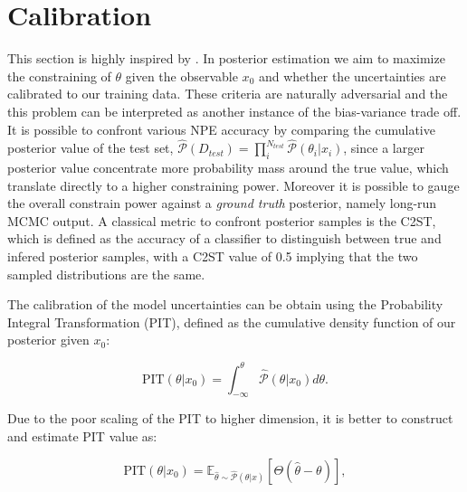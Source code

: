 \section{Calibration}
This section is highly inspired by \cite{hoLtUILIAllinOneFramework2024}. In posterior estimation we aim to maximize the constraining of $\theta$ given the observable $x_0$ and whether the uncertainties are calibrated to our training data. These criteria are naturally adversarial and the this problem can be interpreted as another instance of the bias-variance trade off. 
It is possible to confront various NPE accuracy by comparing the cumulative posterior value of the test set, $\hat{\mathcal{P}}(D_{test})=\prod_i^{N_{test}} \hat{\mathcal{P}}(\theta_i|x_i)$, since a larger posterior value concentrate more probability mass around the true value, which translate directly to a higher constraining power. Moreover it is possible to gauge the overall constrain power against a \textit{ground truth} posterior, namely long-run MCMC output. A classical metric to confront posterior samples is the C2ST, which is defined as the accuracy of a classifier to distinguish between true and infered posterior samples, with a C2ST value of 0.5 implying that the two sampled distributions are the same. 

The calibration of the model uncertainties can be obtain using the Probability Integral Transformation (PIT), defined as the cumulative density function of our posterior given $x_0$:

\begin{equation}
    \text{PIT}(\theta|x_0) = \int_{-\infty}^{\theta} \hat{\mathcal{P}}(\theta|x_0) d\theta. 
\end{equation}

Due to the poor scaling of the PIT to higher dimension, it is better to construct and estimate PIT value as:

\begin{equation}
    \text{PIT}(\theta|x_0) = \mathbb{E}_{\hat{\theta}\sim \hat{\mathcal{P}}(\theta|x)}[\Theta (\hat{\theta} - \theta)],
\label{eq:estimated_PIT}
\end{equation}

